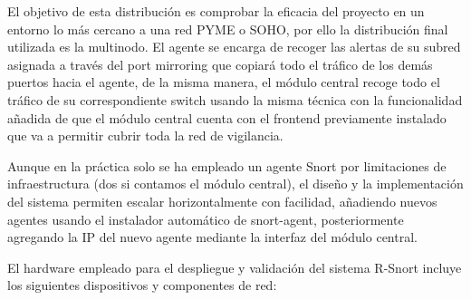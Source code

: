 \documentclass[11pt,a4paper,twoside]{report}
\begin{document}
El objetivo de esta distribución es comprobar la eficacia del proyecto en un entorno lo más cercano a una red PYME o SOHO, por ello la distribución final utilizada es la multinodo. El agente se encarga de recoger las alertas de su subred asignada a través del port mirroring que copiará todo el tráfico de los demás puertos hacia el agente, de la misma manera, el módulo central recoge todo el tráfico de su correspondiente switch usando la misma técnica con la funcionalidad añadida de que el módulo central cuenta con el frontend previamente instalado que va a permitir cubrir toda la red de vigilancia.\newline

Aunque en la práctica solo se ha empleado un agente Snort por limitaciones de infraestructura (dos si contamos el módulo central), el diseño y la implementación del sistema permiten escalar horizontalmente con facilidad, añadiendo nuevos agentes usando el instalador automático de snort-agent, posteriormente agregando la IP del nuevo agente mediante la interfaz del módulo central.\newline

El hardware empleado para el despliegue y validación del sistema R-Snort incluye los siguientes dispositivos y componentes de red:
\end{document}

